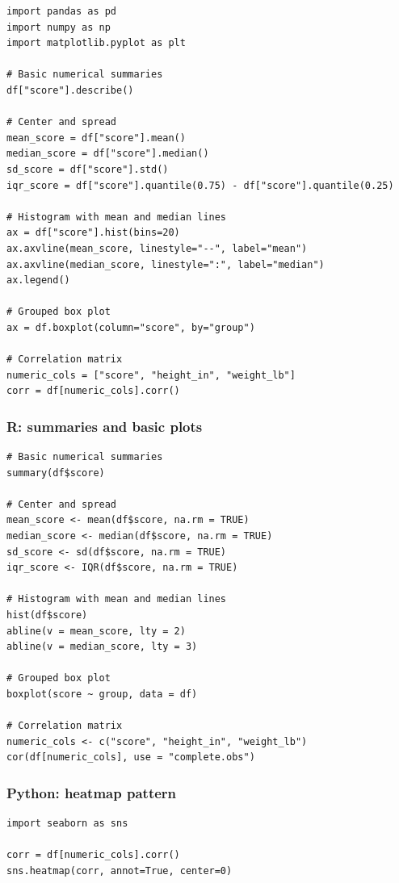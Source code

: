 \begin{verbatim}
import pandas as pd
import numpy as np
import matplotlib.pyplot as plt

# Basic numerical summaries
df["score"].describe()

# Center and spread
mean_score = df["score"].mean()
median_score = df["score"].median()
sd_score = df["score"].std()
iqr_score = df["score"].quantile(0.75) - df["score"].quantile(0.25)

# Histogram with mean and median lines
ax = df["score"].hist(bins=20)
ax.axvline(mean_score, linestyle="--", label="mean")
ax.axvline(median_score, linestyle=":", label="median")
ax.legend()

# Grouped box plot
ax = df.boxplot(column="score", by="group")

# Correlation matrix
numeric_cols = ["score", "height_in", "weight_lb"]
corr = df[numeric_cols].corr()
\end{verbatim}

\subsubsection*{R: summaries and basic plots}

\begin{verbatim}
# Basic numerical summaries
summary(df$score)

# Center and spread
mean_score <- mean(df$score, na.rm = TRUE)
median_score <- median(df$score, na.rm = TRUE)
sd_score <- sd(df$score, na.rm = TRUE)
iqr_score <- IQR(df$score, na.rm = TRUE)

# Histogram with mean and median lines
hist(df$score)
abline(v = mean_score, lty = 2)
abline(v = median_score, lty = 3)

# Grouped box plot
boxplot(score ~ group, data = df)

# Correlation matrix
numeric_cols <- c("score", "height_in", "weight_lb")
cor(df[numeric_cols], use = "complete.obs")
\end{verbatim}

\subsubsection*{Python: heatmap pattern}

\begin{verbatim}
import seaborn as sns

corr = df[numeric_cols].corr()
sns.heatmap(corr, annot=True, center=0)
\end{verbatim}

